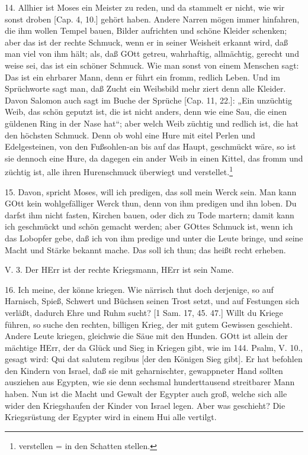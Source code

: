 14. Allhier ist Moses ein Meister zu reden, und da stammelt er nicht, wie wir sonst droben [Cap. 4, 10.] gehört haben. Andere Narren mögen immer hinfahren, die ihm wollen Tempel bauen, Bilder aufrichten und schöne Kleider schenken; aber das ist der rechte Schmuck, wenn er in seiner Weisheit erkannt wird, daß man viel von ihm hält; als, daß GOtt getreu, wahrhaftig, allmächtig, gerecht und weise sei, das ist ein schöner Schmuck. Wie man sonst von einem Menschen sagt: Das ist ein ehrbarer Mann, denn er führt ein fromm, redlich Leben. Und im Sprüchworte sagt man, daß Zucht ein Weibsbild mehr ziert denn alle Kleider. Davon Salomon auch sagt im Buche der Sprüche [Cap. 11, 22.]: „Ein unzüchtig Weib, das schön geputzt ist, die ist nicht anders, denn wie eine Sau, die einen güldenen Ring in der Nase hat“; aber welch Weib züchtig und redlich ist, die hat den höchsten Schmuck. Denn ob wohl eine Hure mit eitel Perlen und Edelgesteinen, von den Fußsohlen-an bis auf das Haupt, geschmückt wäre, so ist sie dennoch eine Hure, da dagegen ein ander Weib in einen Kittel, das fromm und züchtig ist, alle ihren Hurenschmuck überwiegt und verstellet.\footnote{verstellen = in den Schatten stellen.}

15. Davon, spricht Moses, will ich predigen, das soll mein Werck sein. Man kann GOtt kein wohlgefälliger Werck thun, denn von ihm predigen und ihn loben. Du darfst ihm nicht fasten, Kirchen bauen, oder dich zu Tode martern; damit kann ich geschmückt und schön gemacht werden; aber GOttes Schmuck ist, wenn ich das Lobopfer gebe, daß ich von ihm predige und unter die Leute bringe, und seine Macht und Stärke bekannt mache. Das soll ich thun; das heißt recht erheben.

\begin{schriftzitat}
V. 3. Der HErr ist der rechte Kriegsmann, HErr ist sein Name.
\end{schriftzitat}

16. Ich meine, der könne kriegen. Wie närrisch thut doch derjenige, so auf Harnisch, Spieß, Schwert und Büchsen seinen Trost setzt, und auf Festungen sich verläßt, dadurch Ehre und Ruhm sucht? [1 Sam. 17, 45. 47.] Willt du Kriege führen, so suche den rechten, billigen Krieg, der mit gutem Gewissen geschieht. Andere Leute kriegen, gleichwie die Säue mit den Hunden. GOtt ist allein der mächtige HErr, der da Glück und Sieg in Kriegen gibt, wie im 144. Psalm, V. 10., gesagt wird: Qui dat salutem regibus [der den Königen Sieg gibt]. Er hat befohlen den Kindern von Israel, daß sie mit geharnischter, gewappneter Hand sollten ausziehen aus Egypten, wie sie denn sechsmal hunderttausend streitbarer Mann haben. Nun ist die Macht und Gewalt der Egypter auch groß, welche sich alle wider den Kriegshaufen der Kinder von Israel legen. Aber was geschieht? Die Kriegsrüstung der Egypter wird in einem Hui alle vertilgt.

